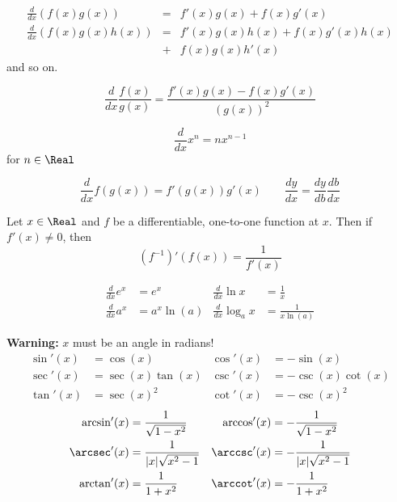 \begin{theorem}
  \[\begin{aligned}
    \frac{d}{dx}(f(x)g(x)) &= &f'(x)g(x) + f(x)g'(x) \\
    \frac{d}{dx}(f(x)g(x)h(x)) &= &f'(x)g(x)h(x) + f(x)g'(x)h(x) \\
                               &+ &f(x)g(x)h'(x)
  \end{aligned}\]
  and so on.
\end{theorem}

\begin{theorem}
  \[
    \frac{d}{dx}\frac{f(x)}{g(x)} = \frac{f'(x)g(x) - f(x)g'(x)}{(g(x))^2}
  \]
\end{theorem}

\begin{theorem}
  \[
    \frac{d}{dx} x^n = nx^{n-1}
  \]
  for $n \in \Real$
\end{theorem}

\begin{theorem}
  \[
    \frac{d}{dx}f(g(x)) = f'(g(x))g'(x) \qquad \frac{dy}{dx} = \frac{dy}{db}\frac{db}{dx}
  \]
\end{theorem}

\begin{theorem}
  Let $x \in \Real$ and $f$ be a differentiable, one-to-one function at $x$. Then if $f'(x) \neq 0$, then
  \[
    (f^{-1})'(f(x)) = \frac{1}{f'(x)}
  \]
\end{theorem}

\begin{theorem}
  \[\begin{aligned}
    \frac{d}{dx} e^x &= e^x &
    \frac{d}{dx} \ln x &= \frac{1}{x} \\
    \frac{d}{dx} a^x &= a^x \ln(a)&
    \frac{d}{dx} \log_a x &= \frac{1}{x\ln(a)}
  \end{aligned}\]
\end{theorem}

\begin{theorem}\leavevmode\newline
  \textbf{Warning:} $x$ must be an angle in radians!
  \[\begin{aligned}
    \sin'(x) &= \cos(x) &
    \cos'(x) &= -\sin(x) \\
    \sec'(x) &= \sec(x)\tan(x) &
    \csc'(x) &= -\csc(x)\cot(x) \\
    \tan'(x) &= \sec(x)^2 &
    \cot'(x) &= -\csc(x)^2
  \end{aligned}\]
  \[\begin{aligned}
    \arcsin'(x) &= \frac{1}{\sqrt{1-x^2}} &
    \arccos'(x) &= -\frac{1}{\sqrt{1-x^2}} \\
    \arcsec'(x) &= \frac{1}{|x|\sqrt{x^2-1}} &
    \arccsc'(x) &= -\frac{1}{|x|\sqrt{x^2-1}} \\
    \arctan'(x) &= \frac{1}{1+x^2} &
    \arccot'(x) &= -\frac{1}{1+x^2}
  \end{aligned}\]
\end{theorem}

